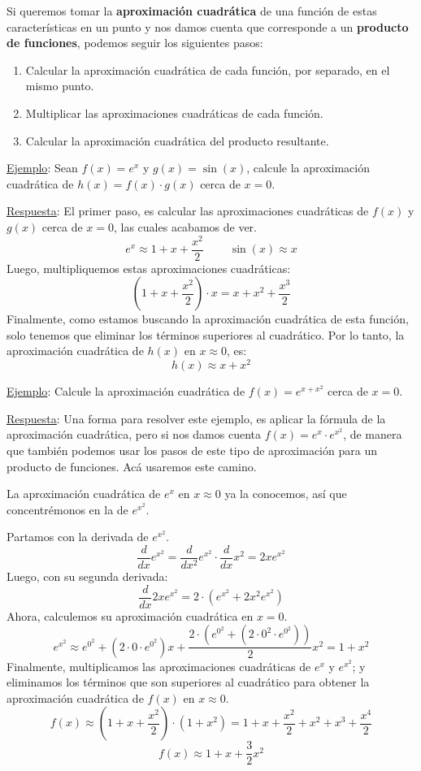 \documentclass[12pt]{article}
\begin{document}
Si queremos tomar la \textbf{aproximación cuadrática} de una función de estas características en un punto y nos damos cuenta que corresponde a un \textbf{producto de funciones}, podemos seguir los siguientes pasos:

\begin{enumerate}
\item Calcular la aproximación cuadrática de cada función, por separado, en el mismo punto.

\item Multiplicar las aproximaciones cuadráticas de cada función.

\item Calcular la aproximación cuadrática del producto resultante.
\end{enumerate}

\underline{Ejemplo}: Sean $f(x) = e^{x}$ y $g(x) = \sin(x)$, calcule la aproximación cuadrática de $h(x) = f(x) \cdot g(x)$ cerca de $x = 0$.

\underline{Respuesta}: El primer paso, es calcular las aproximaciones cuadráticas de $f(x)$ y $g(x)$ cerca de $x = 0$, las cuales acabamos de ver.
\[e^{x} \approx 1 + x + \frac{x^{2}}{2} \ \qquad \sin(x) \approx x\]
Luego, multipliquemos estas aproximaciones cuadráticas:
\[\left(1 + x + \frac{x^{2}}{2}\right) \cdot x = x + x^{2} + \frac{x^{3}}{2}\]
Finalmente, como estamos buscando la aproximación cuadrática de esta función, solo tenemos que eliminar los términos superiores al cuadrático. Por lo tanto, la aproximación cuadrática de $h(x)$ en $x \approx 0$, es:
\[h(x) \approx x + x^{2}\]

\underline{Ejemplo}: Calcule la aproximación cuadrática de $f(x) = e^{x + x^{2}}$ cerca de $x = 0$.

\underline{Respuesta}: Una forma para resolver este ejemplo, es aplicar la fórmula de la aproximación cuadrática, pero si nos damos cuenta $f(x) = e^{x} \cdot e^{x^{2}}$, de manera que también podemos usar los pasos de este tipo de aproximación para un producto de funciones. Acá usaremos este camino.

La aproximación cuadrática de $e^{x}$ en $x \approx 0$ ya la conocemos, así que concentrémonos en la de $e^{x^{2}}$.

Partamos con la derivada de $e^{x^{2}}$.
\[\frac{d}{dx} e^{x^{2}} = \frac{d}{dx^{2}} e^{x^{2}} \cdot \frac{d}{dx} x^{2} = 2xe^{x^{2}}\]
Luego, con su segunda derivada:
\[\frac{d}{dx} 2xe^{x^{2}} = 2 \cdot (e^{x^{2}} + 2x^{2}e^{x^{2}})\]
Ahora, calculemos su aproximación cuadrática en $x = 0$.
\[e^{x^{2}} \approx e^{0^{2}} + \left(2 \cdot 0 \cdot e^{0^{2}}\right)x + \frac{2 \cdot (e^{0^{2}} + (2 \cdot 0^{2} \cdot e^{0^{2}}))}{2} x^{2} = 1 + x^{2}\]
Finalmente, multiplicamos las aproximaciones cuadráticas de $e^{x}$ y $e^{x^{2}}$; y eliminamos los términos que son superiores al cuadrático para obtener la aproximación cuadrática de $f(x)$ en $x \approx 0$.
\[f(x) \approx \left(1 + x + \frac{x^{2}}{2}\right) \cdot (1 + x^{2}) = 1 + x + \frac{x^{2}}{2} + x^{2} + x^{3} + \frac{x^{4}}{2}\]
\[f(x) \approx 1 + x + \frac{3}{2} x^{2}\]
\end{document}
